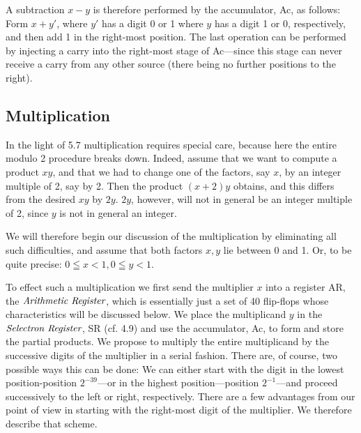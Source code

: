 \documentclass[12pt]{amsart}
\begin{document}
A subtraction $x - y$ is therefore performed by the accumulator, Ac, as follows: Form $x + y'$, where $y'$ has a digit 0 or 1 where $y$ has a digit 1 or 0, respectively, and then add 1 in the right-most position. The last operation can be performed by injecting a carry into the right-most stage of Ac---since this stage can never receive a carry from any other source (there being no further positions to the right).

\subsection{Multiplication}
In the light of 5.7 multiplication requires special care, because here the entire modulo 2 procedure breaks down. Indeed, assume that we want to compute a product $xy$, and that we had to change one of the factors, say $x$, by an integer multiple of 2, say by 2. Then the product $(x + 2)y$ obtains, and this differs from the desired $xy$ by $2y$. $2y$, however, will not in general be an integer multiple of 2, since $y$ is not in general an integer.

We will therefore begin our discussion of the multiplication by eliminating all such difficulties, and assume that both factors $x, y$ lie between 0 and 1. Or, to be quite precise: $0 \leqq x < 1, 0 \leqq y < 1$.

To effect such a multiplication we first send the multiplier $x$ into a register AR, the $\emph{Arithmetic Register}$, which is essentially just a set of 40 flip-flops whose characteristics will be discussed below. We place the multiplicand $y$ in the $\emph{Selectron Register}$, SR (cf. 4.9) and use the accumulator, Ac, to form and store the partial products. We propose to multiply the entire multiplicand by the successive digits of the multiplier in a serial fashion. There are, of course, two possible ways this can be done: We can either start with the digit in the lowest position-position $2^{-39}$---or in the highest position---position $2^{-1}$---and proceed successively to the left or right, respectively. There are a few advantages from our point of view in starting with the right-most digit of the multiplier. We therefore describe that scheme.
\end{document}
